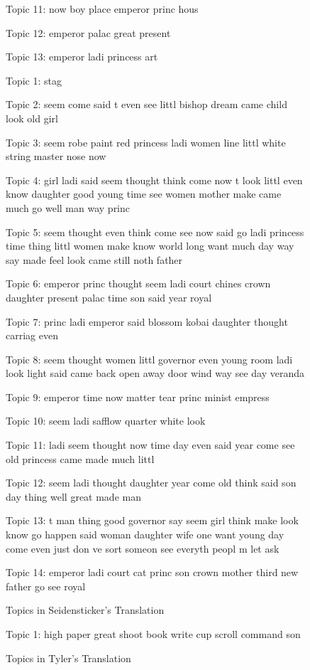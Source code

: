 \documentclass[12pt]{article}
\begin{document}
\begin{flushleft}
\begin{spacing}{2.0}
\begin{figure}
Topic 11: now boy place emperor princ hous 

Topic 12: emperor palac great present 

Topic 13: emperor ladi princess art 
\end{figure}


\begin{figure}
\caption{Topics in Seidensticker's Translation}
\label{seidensticker-topics}
\singlespacing
\small
Topic 1: stag 

Topic 2: seem come said t even see littl bishop dream came child look old girl 

Topic 3: seem robe paint red princess ladi women line littl white string master nose now 

Topic 4: girl ladi said seem thought think come now t look littl even know daughter good young time see women mother make came much go well man way princ 

Topic 5: seem thought even think come see now said go ladi princess time thing littl women make know world long want much day way say made feel look came still noth father 

Topic 6: emperor princ thought seem ladi court chines crown daughter present palac time son said year royal 

Topic 7: princ ladi emperor said blossom kobai daughter thought carriag even 

Topic 8: seem thought women littl governor even young room ladi look light said came back open away door wind way see day veranda 

Topic 9: emperor time now matter tear princ minist empress 

Topic 10: seem ladi safflow quarter white look 

Topic 11: ladi seem thought now time day even said year come see old princess came made much littl 

Topic 12: seem ladi thought daughter year come old think said son day thing well great made man 

Topic 13: t man thing good governor say seem girl think make look know go happen said woman daughter wife one want young day come even just don ve sort someon see everyth peopl m let ask 

Topic 14: emperor ladi court cat princ son crown mother third new father go see royal 
\end{figure}

\begin{figure}
\caption{Topics in Tyler's Translation}
\label{tyler-topics}
\singlespacing
\small
Topic 1: high paper great shoot book write cup scroll command son 


\end{figure}
\end{spacing}
\end{flushleft}
\end{document}
